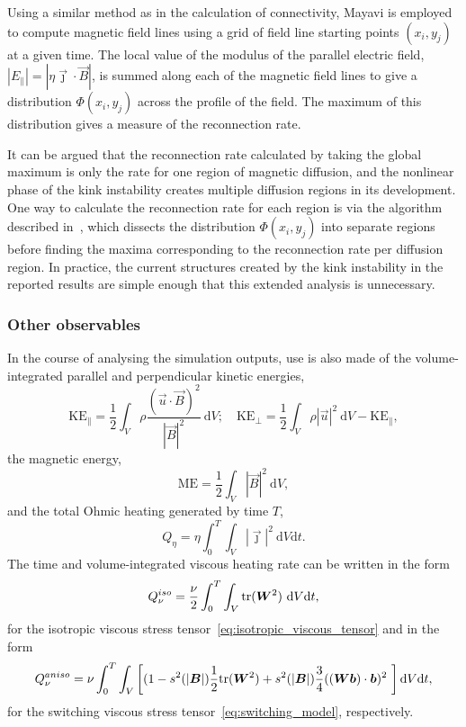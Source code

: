 Using a similar method as in the calculation of connectivity, Mayavi is employed to compute magnetic field lines using a grid of field line starting points $(x_i, y_j)$ at a given time. The local value of the modulus of the parallel electric field, $|E_{\parallel}| = |\eta \vec{\jmath} \cdot \vec{B}|$, is summed along each of the magnetic field lines to give a distribution $\Phi(x_i, y_j)$ across the profile of the field. The maximum of this distribution gives a measure of the reconnection rate.

It can be argued that the reconnection rate calculated by taking the global maximum is only the rate for one region of magnetic diffusion, and the nonlinear phase of the kink instability creates multiple diffusion regions in its development. One way to calculate the reconnection rate for each region is via the algorithm described in~\cite{pontinDynamicsBraidedCoronal2011}, which dissects the distribution $\Phi(x_i, y_j)$ into separate regions before finding the maxima corresponding to the reconnection rate per diffusion region. In practice, the current structures created by the kink instability in the reported results are simple enough that this extended analysis is unnecessary.

\subsubsection{Other observables}

In the course of analysing the simulation outputs, use is also made of the volume-integrated parallel and perpendicular kinetic energies,
\begin{equation}
  \label{eq:kinetic_energies}
  \text{KE}_{\parallel} = \frac{1}{2} \int_V \rho\frac{(\vec{u}\cdot\vec{B})^2}{|\vec{B}|^2}\ \text{d}V; \quad
  \text{KE}_{\perp} = \frac{1}{2} \int_V \rho|\vec{u}|^2\ \text{d}V - \text{KE}_{\parallel},
\end{equation}
the magnetic energy,
\begin{equation}
  \label{eq:magnetic_energy}
   \text{ME} = \frac12\int_V |\vec{B}|^2\ \text{d}V,
\end{equation}
and the total Ohmic heating generated by time $T$,
\begin{equation}
  \label{eq:ohmic_heating}
  Q_{\eta} = \eta \int_0^{T} \int_V |\vec{\jmath}|^2\ \text{d}V \text{d}t.
\end{equation}
The time and volume-integrated viscous heating rate can be written
in the form
\begin{equation}
  \label{eq:iso_viscous_heating}
  Q_{\nu}^{iso} = \frac{\nu}{2} \int_0^T \int_V
  \text{tr}({\bm W}^2)\  \text{d}V \text{d}t,
\end{equation}
for the isotropic viscous stress
tensor~\eqref{eq:isotropic_viscous_tensor} and in the form
\begin{equation}
  \label{eq:aniso_viscous_heating}
  Q_{\nu}^{aniso} = \nu \int_0^T \int_V \left[ (1-s^2(|{\bm B}|)\frac{1}{2}\text{tr}({\bm W}^2) + s^2(|{\bm B}|)\frac{3 }{4} (({\bm W} {\bm b}) \cdot {\bm b})^2\ \right] \text{d}V \text{d}t,
\end{equation}
for the switching viscous stress tensor~\eqref{eq:switching_model}, respectively.

